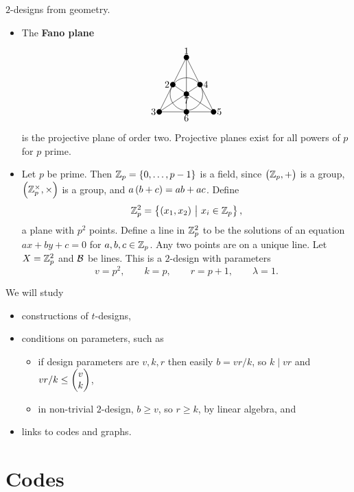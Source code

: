 \begin{example*}
$ 2 $-designs from geometry.
\begin{itemize}
\item The \textbf{Fano plane}
$$
\begin{tikzpicture}
\fill (0, 0) circle (0.1) node[above]{$ 1 $};
\fill (-0.5, -1) circle (0.1) node[left]{$ 2 $};
\fill (0.5, -1) circle (0.1) node[right]{$ 4 $};
\fill (0, -1.35) circle (0.1) node[below]{$ 7 $};
\fill (-1, -2) circle (0.1) node[left]{$ 3 $};
\fill (0, -2) circle (0.1) node[below]{$ 6 $};
\fill (1, -2) circle (0.1) node[right]{$ 5 $};
\draw (0, 0) to (-1, -2);
\draw (0, 0) to (0, -2);
\draw (0, 0) to (1, -2);
\draw (-0.5, -1) to (1, -2);
\draw (0.5, -1) to (-1, -2);
\draw (-1, -2) to (1, -2);
\draw (0, -1.35) circle (0.6);
\end{tikzpicture}
$$
is the projective plane of order two. Projective planes exist for all powers of $ p $ for $ p $ prime.
\item Let $ p $ be prime. Then $ \ZZ_p = \cbr{0, \dots, p - 1} $ is a field, since $ \br{\ZZ_p, +} $ is a group, $ \br{\ZZ_p^\times, \times} $ is a group, and $ a\br{b + c} = ab + ac $. Define
$$ \ZZ_p^2 = \cbr{\br{x_1, x_2} \st x_i \in \ZZ_p}, $$
a plane with $ p^2 $ points. Define a line in $ \mathbb{Z}_p^2 $ to be the solutions of an equation $ ax + by + c = 0 $ for $ a, b, c \in \mathbb{Z}_p $. Any two points are on a unique line. Let $ X = \mathbb{Z}_p^2 $ and $ \mathcal{B} $ be lines. This is a $ 2 $-design with parameters
$$ v = p^2, \qquad k = p, \qquad r = p + 1, \qquad \lambda = 1. $$
\end{itemize}
\end{example*}

We will study
\begin{itemize}
\item constructions of $ t $-designs,
\item conditions on parameters, such as
\begin{itemize}
\item if design parameters are $ v, k, r $ then easily $ b = vr / k $, so $ k \mid vr $ and $ vr / k \le \begin{pmatrix} v \\ k \end{pmatrix} $,
\item in non-trivial $ 2 $-design, $ b \ge v $, so $ r \ge k $, by linear algebra, and
\end{itemize}
\item links to codes and graphs.
\end{itemize}

\pagebreak

\section{Codes}

